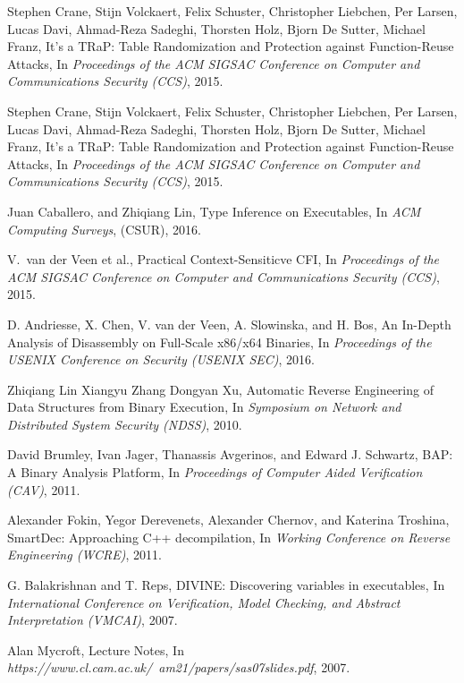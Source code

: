 \documentclass[11pt,a4paper,bibtotoc,idxtotoc,headsepline,footsepline,footexclude,BCOR20mm,DIV10]{scrbook}
\begin{document}
\begin{thebibliography}{50}
Stephen Crane, Stijn Volckaert, Felix Schuster, Christopher Liebchen, Per Larsen,
Lucas Davi, Ahmad-Reza Sadeghi, Thorsten Holz, Bjorn De Sutter, Michael Franz,
{It’s a TRaP: Table Randomization and Protection against Function-Reuse Attacks}, In
\emph{Proceedings of the ACM SIGSAC Conference on Computer and Communications Security (CCS)}, 2015.

Stephen Crane, Stijn Volckaert, Felix Schuster, Christopher Liebchen, Per Larsen,
Lucas Davi, Ahmad-Reza Sadeghi, Thorsten Holz, Bjorn De Sutter, Michael Franz,
{It’s a TRaP: Table Randomization and Protection against Function-Reuse Attacks}, In
\emph{Proceedings of the ACM SIGSAC Conference on Computer and Communications Security (CCS)}, 2015.

Juan Caballero, and Zhiqiang Lin,
{Type Inference on Executables}, In
\emph{ACM Computing Surveys}, (CSUR), 2016.

V.~van der Veen et al., {Practical Context-Sensiticve CFI}, In
\emph{Proceedings of the ACM SIGSAC Conference on Computer and Communications Security (CCS)}, 2015.

D. Andriesse, X. Chen, V. van der Veen, A. Slowinska, and H. Bos, 
{An In-Depth Analysis of Disassembly on Full-Scale x86/x64 Binaries}, In
\emph{Proceedings of the USENIX Conference on Security (USENIX SEC)}, 2016.

Zhiqiang Lin Xiangyu Zhang Dongyan Xu,
{Automatic Reverse Engineering of Data Structures from Binary Execution}, In
\emph{Symposium on Network and Distributed System Security (NDSS)}, 2010.

David Brumley, Ivan Jager, Thanassis Avgerinos, and Edward J. Schwartz,
{BAP: A Binary Analysis Platform}, 
In \emph{Proceedings of Computer Aided Verification (CAV)}, 2011.

Alexander Fokin, Yegor Derevenets, Alexander Chernov, and Katerina Troshina,
{SmartDec: Approaching C++ decompilation}, 
In \emph{Working Conference on Reverse Engineering (WCRE)}, 2011.

G. Balakrishnan and T. Reps,
{DIVINE: Discovering variables in executables}, 
In \emph{International Conference on Verification, Model Checking, and Abstract Interpretation (VMCAI)}, 2007.

Alan Mycroft,
{Lecture Notes}, 
In \emph{https://www.cl.cam.ac.uk/~am21/papers/sas07slides.pdf}, 2007.


\end{thebibliography}
\end{document}
